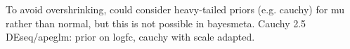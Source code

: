 
To avoid overshrinking, could consider heavy-tailed priors (e.g. cauchy) for mu rather than normal, but this is not possible in bayesmeta.
Cauchy 2.5
DEseq/apeglm: prior on logfc, cauchy with scale adapted.

